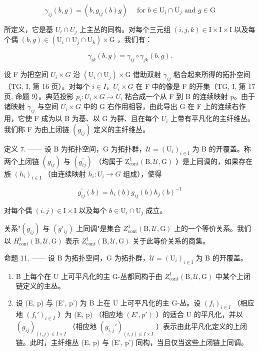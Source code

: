 \[
\gamma_ {i j} (b, g) = \left(b, g _ {i j} (b) g\right) \quad \text {   for   } b \in \mathrm{U} _ {i} \cap \mathrm{U} _ {j} \text {   and   } g \in \mathrm{G}\tag{5}
\]

所定义，它是基 \(U_{i} \cap U_{j}\) 上主丛的同构。对每个三元组 \((i,j,k) \in \mathrm{I} \times \mathrm{I} \times \mathrm{I}\) 以及每个偶 \((b,g) \in (\mathrm{U}_{i} \cap \mathrm{U}_{j} \cap \mathrm{U}_{k}) \times \mathrm{G}\) ，我们有：

\[
\gamma_ {i k} (b, g) = \gamma_ {i j} \circ \gamma_ {j k} (b, g).
\]

设 F 为把空间 \(U_{i} \times G\) 沿 \((\mathrm{U}_{i} \cap \mathrm{U}_{j}) \times \mathrm{G}\) 借助双射 \(\gamma_{ij}\) 粘合起来所得的拓扑空间（TG, I, 第 16 页）。对每个 \(i \in I\)，\(U_{i} \times G\) 在 F 中的像是 F 的开集（TG, I, 第 17 页, 命题 9）。典范投影 \(p_{i}: U_{i} \times G \to U_{i}\) 粘合成一个从 F 到 B 的连续映射 p。由于诸映射 \(\gamma_{ij}\) 与空间 \(U_{i} \times G\) 中的 G 右作用相容，由此导出 G 在 F 上的连续右作用，它使 F 成为以 B 为基、以 G 为群、且在每个 \(U_{i}\) 上带有平凡化的主纤维丛。我们称 F 为由上闭链 \((g_{ij})\) 定义的主纤维丛。

定义 7. —— 设 B 为拓扑空间，G 为拓扑群，\(\mathcal{U} = (\mathrm{U}_{i})_{i\in \mathrm{I}}\) 为 B 的开覆盖。称两个上闭链 \((g_{ij})\) 与 \((g_{ij}^{\prime})\) （均属于 \(\mathrm{Z}_{\mathrm{cont}}^{1}(\mathrm{B},\mathcal{U},\mathrm{G})\) ）是上同调的，如果存在族 \((h_{i})_{i\in\mathrm{I}}\) （由连续映射 \(h_{i}\colon U_{i}\to G\) 组成），使得

\[
g _ {i j} ^ {\prime} (b) = h _ {i} (b) g _ {i j} (b) h _ {j} (b) ^ {- 1}\tag{6}
\]

对每个偶 \((i,j)\in \mathrm{I}\times \mathrm{I}\) 以及每个 \(b\in \mathrm{U}_i\cap \mathrm{U}_j\) 成立。

关系"\((g_{ij})\) 与 \((g'_{ij})\) 上同调"是集合 \(Z_{\mathrm{cont}}^{1}(\mathrm{B},\mathcal{U},\mathrm{G})\) 上的一个等价关系。我们以 \(H_{\mathrm{cont}}^{1}(\mathrm{B},\mathcal{U},\mathrm{G})\) 表示 \(Z_{\mathrm{cont}}^{1}(\mathrm{B},\mathcal{U},\mathrm{G})\) 关于此等价关系的商集。

命题 11. —— 设 B 为拓扑空间，G 为拓扑群，\(\mathcal{U} = (\mathrm{U}_{i})_{i\in \mathrm{I}}\) 为 B 的开覆盖。

\begin{enumerate}
\def\labelenumi{\alph{enumi})}
\item
  B 上每个在 U 上可平凡化的主 G-丛都同构于由 \(Z_{\mathrm{cont}}^{1}(\mathrm{B}, \mathcal{U}, \mathrm{G})\) 中某个上闭链定义的主丛。
\item
  设 (E, p) 与 (E', p') 为 B 上在 U 上可平凡化的主 G-丛。设 \((f_i)_{i \in I}\) （相应地 \((f_i')_{i \in I}\) ）为 (E, p) （相应地 \((E', p')\) ）的适合 U 的平凡化，并以 \((g_{ij})_{(i,j) \in I \times I}\) （相应地 \((g_{i,j}')_{(i,j) \in I \times I}\) ）表示由此平凡化定义的上闭链。此时，主纤维丛 (E, p) 与 (E', p') 同构，当且仅当这些上闭链上同调。
\end{enumerate}


